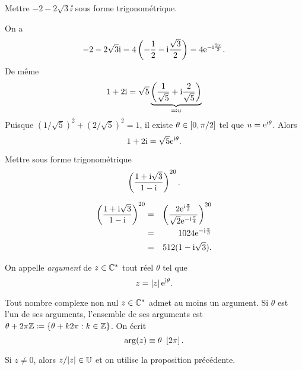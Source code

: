\documentclass{magnoliaold}
\begin{document}
\begin{exos}
  \exo Mettre $-2-2\sqrt{3}\ii$ sous forme trigonométrique. %
  \begin{sol}
  On a
  \[-2-2\sqrt{3}{\rm i}=4\left(-\frac{1}{2}-{\rm i}\frac{\sqrt{3}}{2}\right)=4{\rm e}^{-{\rm i}\frac{2\pi}{3}}.\]
  De même
  \[1+2{\rm i}=\sqrt{5}\underbrace{\left(\frac{1}{\sqrt{5}}+{\rm i}\frac{2}{\sqrt{5}}\right)}_{\eqqcolon u}\]
  Puisque $(1/\sqrt{5})^2+(2/\sqrt{5})^2=1$, il existe $\theta\in\left[0,\pi/2\right]$ tel que $u={\rm e}^{{\rm i}\theta}$. Alors
  \[1+2{\rm i}=\sqrt{5}{\rm e}^{{\rm i}\theta}.\]
  \end{sol}
  \exo Mettre sous forme trigonométrique
    \[\left(\frac{1+{\rm i} \sqrt{3}}{1-{\rm i}}\right)^{20}.\]
  \begin{sol}
  \begin{eqnarray*}
  \left(\frac{1+{\rm i} \sqrt{3}}{1-{\rm i}}\right)^{20}
  &=& \left(\frac{2{\rm e}^{{\rm i}\frac{\pi}{3}}}{\sqrt{2}{\rm e}^{-{\rm i}\frac{\pi}{4}}}\right)^{20}\\
  &=& 1024{\rm e}^{-{\rm i}\frac{\pi}{3}}\\
  &=& 512(1-{\rm i}\sqrt{3}).
  \end{eqnarray*}
  \end{sol}
  \end{exos}



\begin{definition}[utile=-3]
On appelle \emph{argument} de $z\in\mathbb{C}^*$ tout réel
$\theta$ tel que
\[z=\left|z\right|{\rm e}^{{\rm i}\theta}.\]
\end{definition}

\begin{proposition}[utile=-3]
Tout nombre complexe non nul $z\in\mathbb{C}^*$ admet au moins un argument. Si $\theta$ est l'un de ses arguments, l'ensemble de ses arguments est
$\theta+2\pi\mathbb{Z}\coloneqq\left\{\theta+k2\pi : k\in\mathbb{Z}\right\}$. On écrit
\[\arg(z)\equiv\theta\ \cro{2\pi}.\]
\end{proposition}

\begin{preuve}
Si $z\neq 0$, alors $z/|z| \in \U$ et on utilise la proposition précédente.
\end{preuve}
\end{document}
